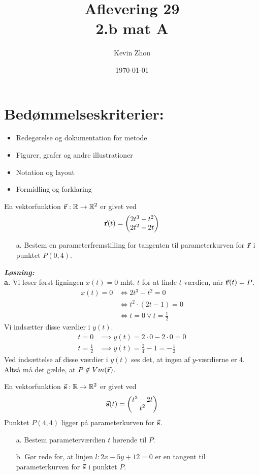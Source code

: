 \documentclass{article}
\title{Aflevering 29\\
{\Large \textbf{2.b mat A}}}
\author{Kevin Zhou}
\date{\today}
\newcommand{\sol}{\setlength{\parindent}{0cm}\textbf{\textit{Løsning:}}\setlength{\parindent}{1cm}}
\begin{document}
\maketitle
\section*{Bedømmelseskriterier:}
\begin{itemize}
    \setlength\itemsep{3cm}
    \Large
    \item  Redegørelse og dokumentation for metode
    \item Figurer, grafer og andre illustrationer
    \item Notation og layout
    \item Formidling og forklaring
\end{itemize}
\pagebreak
\begin{question}{}{}
 En vektorfunktion $\va{r}: \mathbb{R} \to \mathbb{R}^2$ er givet ved
  \[
  \va{r}(t)=\mqty(2t^3-t^2\\ 2t^2-2t) 
  \] 
  \begin{itemize}
    \item[a.] Bestem en parameterfremstilling for tangenten til parameterkurven for $\va{r} $ i punktet $P(0,4)$.
  \end{itemize}
\end{question}
\sol \\
\textbf{a.}
Vi løser først ligningen $x(t)=0$ mht. $t$ for at finde $t$-værdien, når $\va{r}(t)=P$. 
\begin{equation*}
\begin{split}
  x(t)=0 &\iff 2t^3-t^2=0 \\ 
  &\iff t^2 \cdot \left(2t-1\right) =0\\ 
  &\iff t=0 \lor t=\frac{1}{2}
\end{split}
\end{equation*}
Vi indsætter disse værdier i $y(t)$.
\begin{equation*}
\begin{split}
  t=0 &\implies y(t)=2 \cdot 0 - 2 \cdot 0=0\\ 
  t=\frac{1}{2} &\implies y(t)=\frac{2}{4}-1=-\frac{1}{2} 
\end{split}
\end{equation*}
Ved indsættelse af disse værdier i $y(t)$ ses det, at ingen af $y$-værdierne er 4.
Altså må det gælde, at $P\notin Vm(\va{r})$.
\begin{question}{}{}
  En vektorfunktion $\va{s}:\mathbb{R}\to \mathbb{R}^2$ er givet ved 
  \[
  \va{s}(t)=\mqty(t^3-2t\\ t^2)
  \] 
  Punktet $P(4,4)$ ligger på parameterkurven for $\va{s}$. 
  \begin{itemize}
    \item[a.] Bestem parameterværdien $t$ hørende til $P$. 
    \item[b.] Gør rede for, at linjen $l:2x-5y+12=0$ er en tangent til parameterkurven for $\va{s}$ i punktet $P$. 
  \end{itemize}
\end{question}
\end{document}
